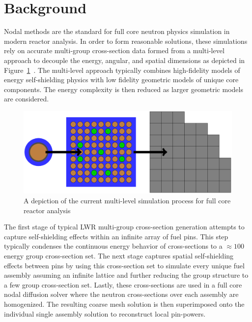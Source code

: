 \section{Background}
\label{sec:chap1-background}

Nodal methods are the standard for full core neutron physics simulation in modern reactor analysis. In order to form reasonable solutions, these simulations rely on accurate multi-group cross-section data formed from a multi-level approach to decouple the energy, angular, and spatial dimensions as depicted in Figure~\ref{fig:multi-level}~\cite{boyd2017thesis}. The multi-level approach typically combines high-fidelity models of energy self-shielding physics with low fidelity geometric models of unique core components. The energy complexity is then reduced as larger geometric models are considered.

\begin{figure}[ht!]
	\centering
	\includegraphics[width=\linewidth]{figures/intro/multi-step-flow-chart.png}
	\caption{A depiction of the current multi-level simulation process for full core reactor analysis}
	\label{fig:multi-level}
\end{figure}

The first stage of typical \ac{LWR} multi-group cross-section generation attempts to capture self-shielding effects within an infinite array of fuel pins. This step typically condenses the continuous energy behavior of cross-sections to a $\approx 100$ energy group cross-section set. The next stage captures spatial self-shielding effects between pins by using this cross-section set to simulate every unique fuel assembly assuming an infinite lattice and further reducing the group structure to a few group cross-section set. Lastly, these cross-sections are used in a full core nodal diffusion solver where the neutron cross-sections over each assembly are homogenized. The resulting coarse mesh solution is then superimposed onto the individual single assembly solution to reconstruct local pin-powers.

